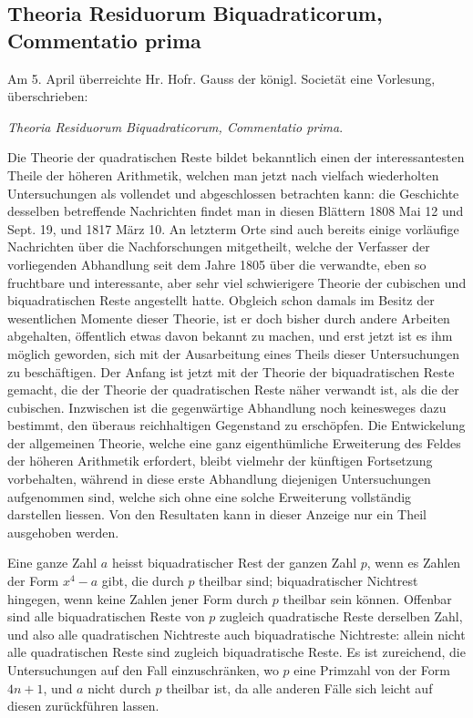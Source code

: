 \documentclass[12pt]{article}
\begin{document}
\subsection*{Theoria Residuorum Biquadraticorum, Commentatio prima}

Am 5. April überreichte Hr. Hofr. Gauss der königl. Societät eine Vorlesung, überschrieben:
\begin{center}\textit{Theoria Residuorum Biquadraticorum, Commentatio prima}.\end{center}
Die Theorie der quadratischen Reste bildet bekanntlich einen der interessantesten Theile der höheren Arithmetik, welchen man jetzt nach vielfach wiederholten Untersuchungen als vollendet und abgeschlossen betrachten kann: die Geschichte desselben betreffende Nachrichten findet man in diesen Blättern 1808 Mai 12 und Sept. 19, und 1817 März 10. An letzterm Orte sind auch bereits einige vorläufige Nachrichten über die Nachforschungen mitgetheilt, welche der Verfasser der vorliegenden Abhandlung seit dem Jahre 1805 über die verwandte, eben so fruchtbare und interessante, aber sehr viel schwierigere Theorie der cubischen und biquadratischen Reste angestellt hatte. Obgleich schon damals im Besitz der wesentlichen Momente dieser Theorie, ist er doch bisher durch andere Arbeiten abgehalten, öffentlich etwas davon bekannt zu machen, und erst jetzt ist es ihm möglich geworden, sich mit der Ausarbeitung eines Theils dieser Untersuchungen zu beschäftigen. Der Anfang ist jetzt mit der Theorie der biquadratischen Reste gemacht, die der Theorie der quadratischen Reste näher verwandt ist, als die der cubischen. Inzwischen ist die gegenwärtige Abhandlung noch keinesweges dazu bestimmt, den überaus reichhaltigen Gegenstand zu erschöpfen. Die Entwickelung der allgemeinen Theorie, welche eine ganz eigenthümliche Erweiterung des Feldes der höheren Arithmetik erfordert, bleibt vielmehr der künftigen Fortsetzung vorbehalten, während in diese erste Abhandlung diejenigen Untersuchungen aufgenommen sind, welche sich ohne eine solche Erweiterung vollständig darstellen liessen. Von den Resultaten kann in dieser Anzeige nur ein Theil ausgehoben werden.

Eine ganze Zahl $a$ heisst biquadratischer Rest der ganzen Zahl $p$, wenn es Zahlen der Form $x^4-a$ gibt, die durch $p$ theilbar sind; biquadratischer Nichtrest hingegen, wenn keine Zahlen jener Form durch $p$ theilbar sein können. Offenbar sind alle biquadratischen Reste von $p$ zugleich quadratische Reste derselben Zahl, und also alle quadratischen Nichtreste auch biquadratische Nichtreste: allein nicht alle quadratischen Reste sind zugleich biquadratische Reste. Es ist zureichend, die Untersuchungen auf den Fall einzuschränken, wo $p$ eine Primzahl von der Form $4n+1$, und $a$ nicht durch $p$ theilbar ist, da alle anderen Fälle sich leicht auf diesen zurückführen lassen.
\end{document}
